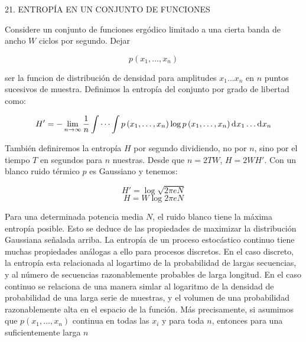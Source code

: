21. ENTROP\'IA EN UN CONJUNTO DE FUNCIONES\newline

Considere un conjunto de funciones erg\'odico limitado a una cierta banda de ancho  $W$ ciclos por segundo. Dejar

\begin{equation}
p\left ( x_{1}, \ldots ,x_{n}\right )
\end{equation}

ser la funcion de distribuci\'on de densidad para amplitudes $x_{1}\dots x_{n}$ en $n$ puntos sucesivos de muestra. Definimos la entrop\'ia del conjunto por grado de libertad como:

\begin{equation}
{H}'=-\lim_{n\rightarrow \infty }\frac{1}{n}\int \cdots \int p\left ( x_{1}, \ldots ,x_{n}\right ) \log p\left ( x_{1}, \ldots ,x_{n}\right ) \diff x _{1} \ldots  \diff x _{n}
\end{equation}

Tambi\'en definiremos la entrop\'ia $H$ por segundo dividiendo, no por $n$, sino por el tiempo $T$ en segundos para $n$ nuestras. Desde que $n=2TW$, $H=2W{H}'$.\newline
Con un blanco ruido t\'ermico $p$ es Gaussiano y tenemos:

\begin{equation}
{H}'=\log \sqrt{2\pi eN}
\end{equation}
\begin{equation}
H=W\log 2\pi eN
\end{equation}

Para una determinada potencia media $N$, el ruido blanco tiene la m\'axima entrop\'ia posible. Esto se deduce de las propiedades de maximizar la distribuci\'on Gaussiana se\~nalada arriba.\newline
La entrop\'ia de un proceso estoc\'astico continuo tiene muchas propiedades an\'alogas a ello para procesos discretos. En el caso discreto, la entrop\'ia esta relacionada al logartimo de la probabilidad de largas secuencias, y al n\'umero de secuencias razonablemente probables de larga longitud. En el caso continuo se relaciona de una manera simlar al logaritmo de la densidad de probabilidad de una larga serie de muestras, y el volumen de una probabilidad razonablemente alta en el espacio de la funci\'on.\newline
M\'as precisamente, si asumimos que $p\left ( x_{1},\dots ,x_{n} \right )$ continua en todas las $x_{i}$ y para toda $n$, entonces para una suficientemente larga $n$

